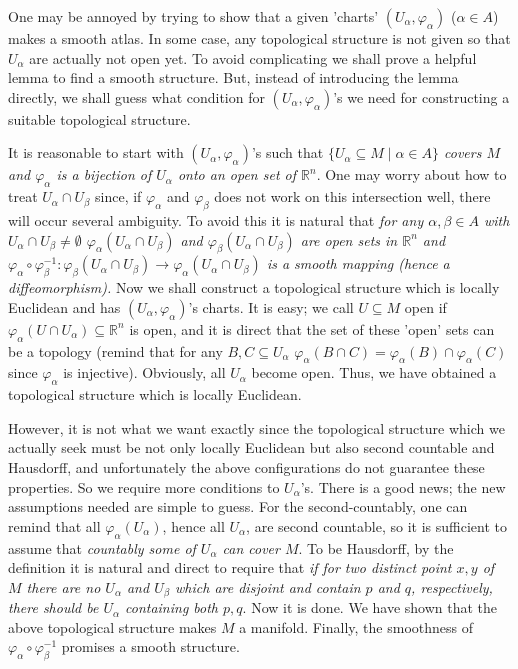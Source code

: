 \documentclass{article}
\newcommand{\ReR}{\mathbb{R}}
\newcommand{\SBar}{\;|\;}
\begin{document}
One may be annoyed by trying to show that a given 'charts' $(U_\alpha, \varphi_\alpha)$ ($\alpha \in A$) makes a smooth atlas.
In some case, any topological structure is not given so that $U_\alpha$ are actually not open yet.
To avoid complicating we shall prove a helpful lemma to find a smooth structure.
But, instead of introducing the lemma directly, we shall guess what condition for $(U_\alpha, \varphi_\alpha)$'s we need for constructing a suitable topological structure.

It is reasonable to start with $(U_\alpha, \varphi_\alpha)$'s such that \textit{$\{U_\alpha \subseteq M \SBar \alpha \in A\}$ covers $M$ and $\varphi_\alpha$ is a bijection of $U_\alpha$ onto an open set of $\ReR^n$}.
One may worry about how to treat $U_\alpha \cap U_\beta$ since, if $\varphi_\alpha$ and $\varphi_\beta$ does not work on this intersection well, there will occur several ambiguity.
To avoid this it is natural that \textit{for any $\alpha, \beta \in A$ with $U_\alpha \cap U_\beta \ne \emptyset$ $\varphi_\alpha(U_\alpha \cap U_\beta)$ and $\varphi_\beta(U_\alpha \cap U_\beta)$ are open sets in $\ReR^n$ and $\varphi_\alpha \circ \varphi_\beta^{-1} : \varphi_\beta(U_\alpha \cap U_\beta) \to \varphi_\alpha(U_\alpha \cap U_\beta)$ is a smooth mapping (hence a diffeomorphism).}
Now we shall construct a topological structure which is locally Euclidean and has $(U_\alpha, \varphi_\alpha)$'s charts.
It is easy; we call $U \subseteq M$ open if $\varphi_\alpha(U \cap U_\alpha) \subseteq \ReR^n$ is open, and it is direct that the set of these 'open' sets can be a topology (remind that for any $B, C \subseteq U_\alpha$ $\varphi_\alpha(B \cap C) =  \varphi_\alpha(B) \cap \varphi_\alpha(C)$ since $\varphi_\alpha$ is injective).
Obviously, all $U_\alpha$ become open.
Thus, we have obtained a topological structure which is locally Euclidean.

However, it is not what we want exactly since the topological structure which we actually seek must be not only locally Euclidean but also second countable and Hausdorff, and unfortunately the above configurations do not guarantee these properties.
So we require more conditions to $U_\alpha$'s.
There is a good news; the new assumptions needed are simple to guess.
For the second-countably, one can remind that all $\varphi_\alpha(U_\alpha)$, hence all $U_\alpha$, are second countable, so it is sufficient to assume that \textit{countably some of $U_\alpha$ can cover $M$}.
To be Hausdorff, by the definition it is natural and direct to require that \textit{if for two distinct point $x, y$ of $M$ there are no $U_\alpha$ and $U_\beta$ which are disjoint and contain $p$ and $q$, respectively, there should be $U_\alpha$ containing both $p, q$}.
Now it is done.
We have shown that the above topological structure makes $M$ a manifold.
Finally, the smoothness of $\varphi_\alpha \circ \varphi_\beta^{-1}$ promises a smooth structure.
\end{document}
